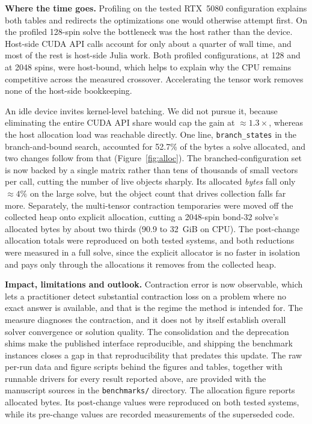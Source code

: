 \documentclass[preprint,12pt,a4paper]{elsarticle}
\begin{document}
\textbf{Where the time goes.} Profiling on the tested RTX~5080 configuration
explains both tables and redirects the optimizations one would otherwise attempt
first. On the profiled 128-spin solve the bottleneck was the host rather than the
device. Host-side CUDA API calls account for only about a quarter of wall time, and
most of the rest is host-side Julia work. Both profiled configurations, at
128 and at 2048 spins, were host-bound, which helps to explain why the CPU remains
competitive across the measured crossover. Accelerating the tensor work removes none
of the host-side bookkeeping.

An idle device invites kernel-level batching. We did not pursue it, because
eliminating the entire CUDA API share would cap the gain at ${\approx}1.3\times$,
whereas the host allocation load was reachable directly. One line,
\texttt{branch\_states} in the branch-and-bound search, accounted for 52.7\% of the
bytes a solve allocated, and two changes follow from that
(Figure~\ref{fig:alloc}). The branched-configuration set is now backed by a single
matrix rather than tens of thousands of small vectors per call, cutting the number
of live objects sharply. Its allocated \emph{bytes} fall only ${\approx}4\%$ on
the large solve, but the object count that drives collection falls far more.
Separately, the multi-tensor contraction temporaries were moved off the collected
heap onto explicit allocation, cutting a 2048-spin bond-32 solve's allocated bytes
by about two thirds (90.9 to 32~GiB on CPU). The post-change allocation totals were
reproduced on both tested systems, and both reductions were measured in a full solve,
since the explicit allocator is no faster in isolation and pays only through the
allocations it removes from the collected heap.

\textbf{Impact, limitations and outlook.} Contraction error is now observable,
which lets a practitioner detect substantial contraction loss on a problem where no
exact answer is available, and that is the regime the method is intended for. The
measure diagnoses the contraction, and it does not by itself establish overall
solver convergence or solution quality. The consolidation and the deprecation shims
make the published interface reproducible, and shipping the benchmark instances
closes a gap in that reproducibility that predates this update. The raw per-run
data and figure scripts behind the figures and tables, together with runnable
drivers for every result reported above, are provided with the manuscript sources
in the \texttt{benchmarks/} directory. The allocation figure reports allocated
bytes. Its post-change values were reproduced on both tested systems, while its
pre-change values are recorded measurements of the superseded code.
\end{document}
